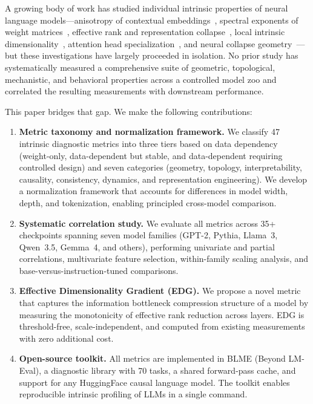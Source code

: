 \documentclass{article}
\begin{document}
A growing body of work has studied individual intrinsic properties of neural language models---anisotropy of contextual embeddings~\citep{ethayarajh2019contextual}, spectral exponents of weight matrices~\citep{martin2021implicit}, effective rank and representation collapse~\citep{jing2021understanding}, local intrinsic dimensionality~\citep{ma2018characterizing}, attention head specialization~\citep{olsson2022context}, and neural collapse geometry~\citep{papyan2020prevalence}---but these investigations have largely proceeded in isolation.
No prior study has systematically measured a comprehensive suite of geometric, topological, mechanistic, and behavioral properties across a controlled model zoo and correlated the resulting measurements with downstream performance.

This paper bridges that gap. We make the following contributions:

\begin{enumerate}
  \item \textbf{Metric taxonomy and normalization framework.} We classify 47 intrinsic diagnostic metrics into three tiers based on data dependency (weight-only, data-dependent but stable, and data-dependent requiring controlled design) and seven categories (geometry, topology, interpretability, causality, consistency, dynamics, and representation engineering). We develop a normalization framework that accounts for differences in model width, depth, and tokenization, enabling principled cross-model comparison.

  \item \textbf{Systematic correlation study.} We evaluate all metrics across 35+ checkpoints spanning seven model families (GPT-2, Pythia, Llama~3, Qwen~3.5, Gemma~4, and others), performing univariate and partial correlations, multivariate feature selection, within-family scaling analysis, and base-versus-instruction-tuned comparisons.

  \item \textbf{Effective Dimensionality Gradient (EDG).} We propose a novel metric that captures the information bottleneck compression structure of a model by measuring the monotonicity of effective rank reduction across layers. EDG is threshold-free, scale-independent, and computed from existing measurements with zero additional cost.

  \item \textbf{Open-source toolkit.} All metrics are implemented in BLME (Beyond LM-Eval), a diagnostic library with 70 tasks, a shared forward-pass cache, and support for any HuggingFace causal language model. The toolkit enables reproducible intrinsic profiling of LLMs in a single command.
\end{enumerate}
\end{document}
